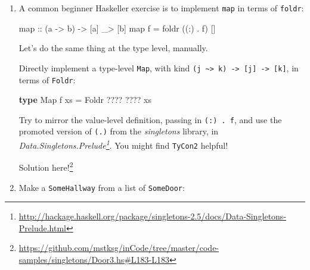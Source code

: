 \documentclass[]{article}
\newenvironment{Shaded}{}{}
\newcommand{\DataTypeTok}[1]{\textcolor[rgb]{0.56,0.13,0.00}{#1}}
\newcommand{\DecValTok}[1]{\textcolor[rgb]{0.25,0.63,0.44}{#1}}
\newcommand{\FunctionTok}[1]{\textcolor[rgb]{0.02,0.16,0.49}{#1}}
\newcommand{\KeywordTok}[1]{\textcolor[rgb]{0.00,0.44,0.13}{\textbf{#1}}}
\newcommand{\NormalTok}[1]{#1}
\newcommand{\OtherTok}[1]{\textcolor[rgb]{0.00,0.44,0.13}{#1}}
\renewcommand{\href}[2]{#2\footnote{\url{#1}}}
\begin{document}
\begin{enumerate}
\begin{Shaded}
\begin{Highlighting}[]
\OtherTok{sevenIsOdd ::} \DataTypeTok{IsOdd} \DecValTok{7}
\end{Highlighting}
\end{Shaded}

  \href{https://github.com/mstksg/inCode/tree/master/code-samples/singletons/Door3.hs\#L165-L165}{Solution
  here!}

  On a sad note, one exercise I'd like to be able to add is to ask you to write
  decision functions and proofs of not-even or not-odd, but unfortunately,
  \texttt{Nat} is not rich enough to support this out of the box without a lot
  of extra tooling!
\item
  A common beginner Haskeller exercise is to implement \texttt{map} in terms of
  \texttt{foldr}:

\begin{Shaded}
\begin{Highlighting}[]
\NormalTok{map}\OtherTok{ ::}\NormalTok{ (a }\OtherTok{->}\NormalTok{ b) }\OtherTok{->}\NormalTok{ [a] _}\FunctionTok{>}\NormalTok{ [b]}
\NormalTok{map f }\FunctionTok{=}\NormalTok{ foldr ((}\FunctionTok{:}\NormalTok{) }\FunctionTok{.}\NormalTok{ f) []}
\end{Highlighting}
\end{Shaded}

  Let's do the same thing at the type level, manually.

  Directly implement a type-level \texttt{Map}, with kind
  \texttt{(j\ \textasciitilde{}\textgreater{}\ k)\ -\textgreater{}\ {[}j{]}\ -\textgreater{}\ {[}k{]}},
  in terms of \texttt{Foldr}:

\begin{Shaded}
\begin{Highlighting}[]
\KeywordTok{type} \DataTypeTok{Map}\NormalTok{ f xs }\FunctionTok{=} \DataTypeTok{Foldr} \FunctionTok{????} \FunctionTok{????}\NormalTok{ xs}
\end{Highlighting}
\end{Shaded}

  Try to mirror the value-level definition, passing in \texttt{(:)\ .\ f}, and
  use the promoted version of \texttt{(.)} from the \emph{singletons} library,
  in
  \emph{\href{http://hackage.haskell.org/package/singletons-2.5/docs/Data-Singletons-Prelude.html}{Data.Singletons.Prelude}}.
  You might find \texttt{TyCon2} helpful!

  \href{https://github.com/mstksg/inCode/tree/master/code-samples/singletons/Door3.hs\#L183-L183}{Solution
  here!}
\item
  Make a \texttt{SomeHallway} from a list of \texttt{SomeDoor}:


\end{enumerate}
\end{document}

